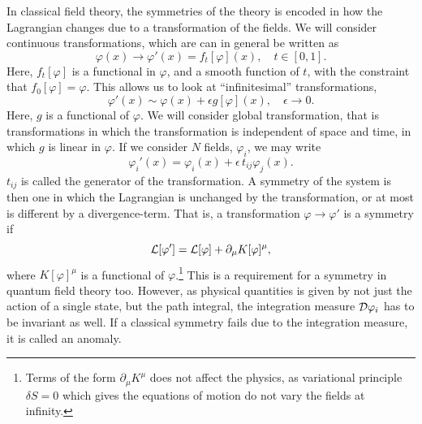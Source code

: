 In classical field theory, the symmetries of the theory is encoded in how the Lagrangian changes due to a transformation of the fields.
We will consider continuous transformations, which are can in general be written as
\begin{equation}
    \varphi(x) \longrightarrow \varphi'(x) = f_t[\varphi](x), \quad t \in [0, 1].
\end{equation}
Here, $f_t[\varphi]$ is a functional in $\varphi$, and a smooth function of $t$, with the constraint that $f_0[\varphi] = \varphi$.
This allows us to look at ``infinitesimal'' transformations,
\begin{equation}
    \label{infinitesimal transformation}
    \varphi'(x) \sim \varphi(x) + \epsilon g[\varphi](x), \quad \epsilon \rightarrow 0.
\end{equation}
Here, $g$ is a functional of $\varphi$.
We will consider global transformation, that is transformations in which the transformation is independent of space and time, in which $g$ is linear in $\varphi$.
If we consider $N$ fields, $\varphi_i$, we may write
\begin{equation}
    \varphi_i'(x) = \varphi_i(x) + \epsilon \, t_{ij} \varphi_j(x).
\end{equation}
$t_{ij}$ is called the generator of the transformation.
A symmetry of the system is then one in which the Lagrangian is unchanged by the transformation, or at most is different by a divergence-term.
That is, a transformation $\varphi \rightarrow \varphi'$ is a symmetry if 
\begin{equation}
    \mathcal{L}[\varphi'] = \mathcal{L}[\varphi] + \partial_\mu K[\varphi]^\mu,
\end{equation}
where $K[\varphi]^\mu$ is a functional of $\varphi$.\footnote{Terms of the form $\partial_\mu K^\mu$ does not affect the physics, as variational principle $\delta S = 0$ which gives the equations of motion do not vary the fields at infinity.}
This is a requirement for a symmetry in quantum field theory too.
However, as physical quantities is given by not just the action of a single state, but the path integral, the integration measure $\mathcal{D} \varphi_i$ has to be invariant as well.
If a classical symmetry fails due to the integration measure, it is called an anomaly.

